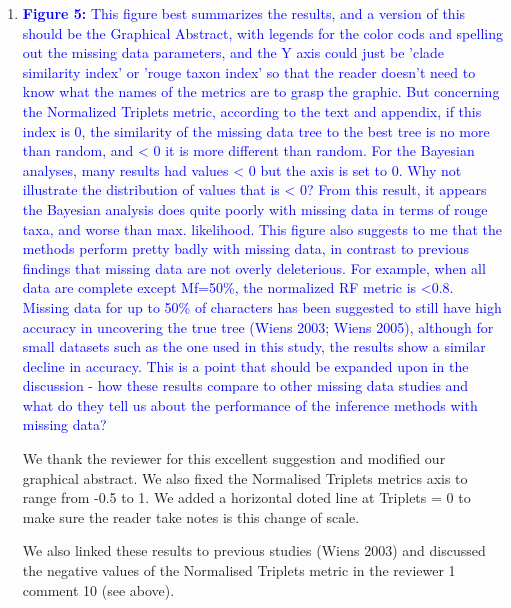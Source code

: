 \documentclass[12pt,letterpaper]{article}
\begin{document}
\begin{enumerate}
\item{\textcolor{blue}{\textbf{Figure 5:} This figure best summarizes the results, and a version of this should be the Graphical Abstract, with legends for the color cods and spelling out the missing data parameters, and the Y axis could just be 'clade similarity index' or 'rouge taxon index' so that the reader doesn't need to know what the names of the metrics are to grasp the graphic.
But concerning the Normalized Triplets metric, according to the text and appendix, if this index is 0, the similarity of the missing data tree to the best tree is no more than random, and < 0 it is more different than random.
For the Bayesian analyses, many results had values < 0 but the axis is set to 0.
Why not illustrate the distribution of values that is < 0? %
From this result, it appears the Bayesian analysis does quite poorly with missing data in terms of rouge taxa, and worse than max. likelihood.
This figure also suggests to me that the methods perform pretty badly with missing data, in contrast to previous findings that missing data are not overly deleterious.
For example, when all data are complete except Mf=50\%, the normalized RF metric is <0.8.
Missing data for up to 50\% of characters has been suggested to still have high accuracy in uncovering the true tree (Wiens 2003; Wiens 2005), although for small datasets such as the one used in this study, the results show a similar decline in accuracy.
This is a point that should be expanded upon in the discussion - how these results compare to other missing data studies and what do they tell us about the performance of the inference methods with missing data?}}

We thank the reviewer for this excellent suggestion and modified our graphical abstract. We also fixed the Normalised Triplets metrics axis to range from -0.5 to 1. We added a horizontal doted line at Triplets = 0 to make sure the reader take notes is this change of scale.

We also linked these results to previous studies (Wiens 2003) and discussed the negative values of the Normalised Triplets metric in the reviewer 1 comment 10 (see above).


\end{enumerate}
\end{document}
